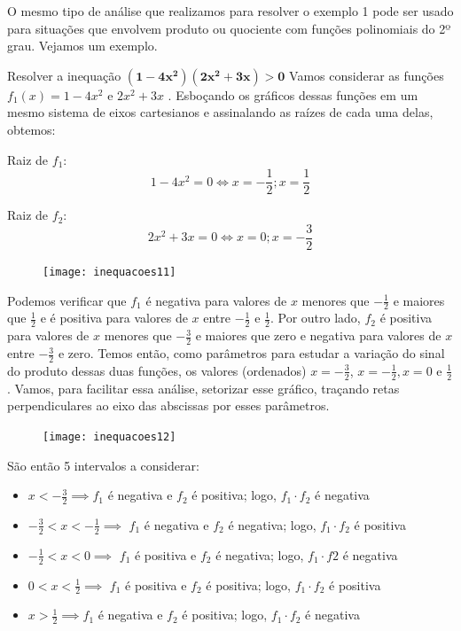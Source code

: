 O mesmo tipo de análise que realizamos para resolver o exemplo 1 pode ser usado para situações que envolvem produto ou quociente com funções polinomiais do 2º grau. Vejamos um exemplo.

\begin{example}{Resolver a inequação $\bm{(1-4x^2)(2x^2+3x)>0}$}
Vamos considerar as funções $f_1(x)=1-4x^2$ e $2x^2+3x$ . Esboçando os gráficos dessas funções em um mesmo sistema de eixos cartesianos e assinalando as raízes de cada uma delas, obtemos:

\begin{multicols}{2}
\centering
Raiz de $f_1$:
\begin{equation*}
1-4x^2=0\iff x=-\frac{1}{2};x=\frac{1}{2}
\end{equation*}

Raiz de $f_2$:
\begin{equation*}
2x^2+3x=0\iff x=0;x=-\frac{3}{2}
\end{equation*}
\end{multicols}


\begin{figure}[H]
\centering

\texttt{[image: inequacoes11]}
\end{figure}

Podemos verificar que $f_1$ é negativa para valores de $x$ menores que $-\frac{1}{2}$ e maiores que $\frac{1}{2}$ e é positiva para valores de $x$ entre $-\frac{1}{2}$ e $\frac{1}{2}$. Por outro lado, $f_2$ é positiva para valores de $x$ menores que $-\frac{3}{2}$ e maiores que zero e negativa para valores de $x$ entre $-\frac{3}{2}$ e zero. Temos então, como parâmetros para estudar a variação do sinal do produto dessas duas funções, os valores (ordenados) $x=-\frac{3}{2}$, $x=-\frac{1}{2}, x=0$ e $\frac{1}{2}$. Vamos, para facilitar essa análise, setorizar esse gráfico, traçando retas perpendiculares ao eixo das abscissas por esses parâmetros.

\begin{figure}[H]
\centering

\texttt{[image: inequacoes12]}
\end{figure}

São então 5 intervalos a considerar:

\begin{itemize}
\item $x<-\frac{3}{2}\implies f_1$ é negativa e $f_2$ é positiva; logo, $f_1\cdot f_2$ é negativa
\item $-\frac{3}{2}<x<-\frac{1}{2} \implies$ $f_1$ é negativa e $f_2$ é negativa; logo, $f_1\cdot f_2$ é positiva
\item $-\frac{1}{2}<x<0 \implies$ $f_1$ é positiva e $f_2$ é negativa; logo, $f_1\cdot f2$ é negativa
\item $0<x<\frac{1}{2}\implies$ $f_1$ é positiva e $f_2$ é positiva; logo, $f_1\cdot f_2$ é positiva
\item $x>\frac{1}{2} \implies f_1$ é negativa e $f_2$ é positiva; logo, $f_1\cdot f_2$ é negativa
\end{itemize}



\end{example}
